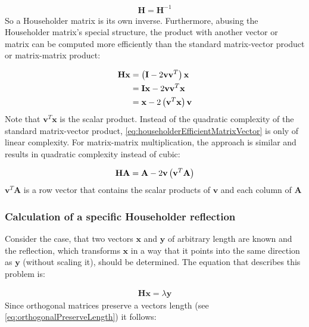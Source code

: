 \begin{align}
\label{eq:householderInverse}
\mathbf{H} = \mathbf{H}^{-1}
\end{align}
%
So a Householder matrix is its own inverse.
Furthermore, abusing the Householder matrix's special structure, the product with another vector or matrix can be computed more efficiently than the standard matrix-vector product or matrix-matrix product:

\begin{align}
\nonumber
\mathbf{H} \mathbf{x}
&= 
\left(\mathbf{I} - 2\mathbf{v}\mathbf{v}^T\right)\mathbf{x}
\\&= 
\nonumber
\mathbf{I}\mathbf{x} - 2\mathbf{v}\mathbf{v}^T\mathbf{x}
\\&= 
\label{eq:householderEfficientMatrixVector}
\mathbf{x} - 2\left(\mathbf{v}^T\mathbf{x}\right)\mathbf{v}
\end{align}
%
Note that $\mathbf{v}^T\mathbf{x}$ is the scalar product.
Instead of the quadratic complexity of the standard matrix-vector product, \cref{eq:householderEfficientMatrixVector} is only of linear complexity.
For matrix-matrix multiplication, the approach is similar and results in quadratic complexity instead of cubic:

\begin{align}
\label{eq:householderEfficientMatrixMatrix}
\mathbf{H} \mathbf{A}
=
\mathbf{A} - 2\mathbf{v}\left(\mathbf{v}^T\mathbf{A}\right)
\end{align}
%
$\mathbf{v}^T\mathbf{A}$ is a row vector that contains the scalar products of $\mathbf{v}$ and each column of $\mathbf{A}$




\subsubsection{Calculation of a specific Householder reflection}
\label{sec:householderCalculateSpecificReflection}

Consider the case, that two vectors $\mathbf{x}$ and $\mathbf{y}$ of arbitrary length are known and the reflection, which transforms $\mathbf{x}$ in a way that it points into the same direction as $\mathbf{y}$ (without scaling it), should be determined.
The equation that describes this problem is:

\begin{align}
\label{eq:housholderCalculateReflection}
\mathbf{H} \mathbf{x} = \lambda \mathbf{y}
\end{align}
%
Since orthogonal matrices preserve a vectors length (see \cref{eq:orthogonalPreserveLength}) it follows:

